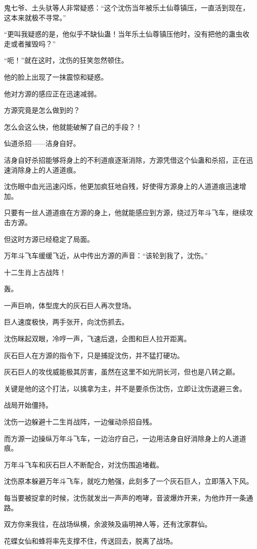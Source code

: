 \begin{this_body}
鬼七爷、土头驮等人非常疑惑：“这个沈伤当年被乐土仙尊镇压，一直活到现在，这本来就极不寻常。”

“更叫我疑惑的是，他似乎不缺仙蛊！当年乐土仙尊镇压他时，没有把他的蛊虫收走或者摧毁吗？”

“呃！”就在这时，沈伤的狂笑忽然顿住。

他的脸上出现了一抹震惊和疑惑。

他对方源的感应正在迅速减弱。

方源究竟是怎么做到的？

怎么会这么快，他就能破解了自己的手段？！

仙道杀招——洁身自好。

洁身自好杀招能够将身上的不利道痕逐渐消除，方源凭借这个仙蛊和杀招，正在迅速消除身上的人道道痕。

沈伤眼中血光迅速闪烁，他更加疯狂地自残，好使得方源身上的人道道痕迅速增加。

只要有一丝人道道痕在方源的身上，他就能感应到方源，绕过万年斗飞车，继续攻击方源。

但这时方源已经稳定了局面。

万年斗飞车缓缓飞近，从中传出方源的声音：“该轮到我了，沈伤。”

十二生肖上古战阵！

轰。

一声巨响，体型庞大的灰石巨人再次登场。

巨人速度极快，两手张开，向沈伤抓去。

沈伤眯起双眼，冷哼一声，飞速后退，企图和巨人拉开距离。

灰石巨人在方源的指令下，只是捕捉沈伤，并不猛打硬功。

灰石巨人的攻伐威能极其厉害，虽然在这里不如光阴长河，但也是八转之巅。

关键是他的这个打法，以擒拿为主，并不是要杀伤沈伤，立即让沈伤退避三舍。

战局开始僵持。

沈伤一边躲避十二生肖战阵，一边催动杀招自残。

而方源一边操纵万年斗飞车，一边治疗自己，一边用洁身自好消除身上的人道道痕。

万年斗飞车和灰石巨人不断配合，对沈伤围追堵截。

沈伤原本躲避万年斗飞车，就吃力勉强，此刻多了一个灰石巨人，立即落入下风。

每当要被捉拿的时候，沈伤就发出一声声的咆哮，音波爆炸开来，为他炸开一条通路。

双方你来我往，在战场纵横，余波殃及庙明神人等，还有沈家群仙。

花蝶女仙和蜂将率先支撑不住，传送回去，脱离了战场。


\end{this_body}

